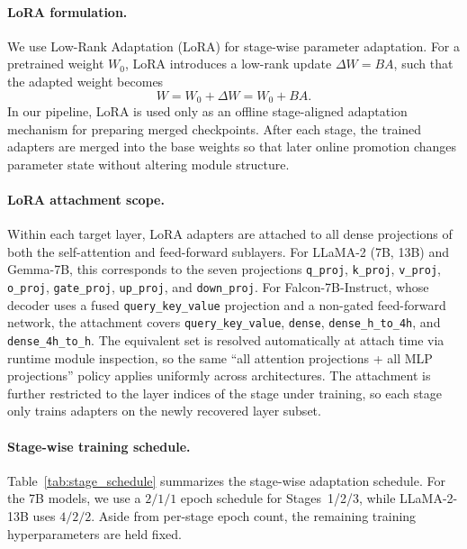 \documentclass[sigplan,anonymous,review,nonacm]{acmart}
\begin{document}
\paragraph{LoRA formulation.}
We use Low-Rank Adaptation (LoRA) for stage-wise parameter adaptation.
For a pretrained weight $W_0$, LoRA introduces a low-rank update
$\Delta W = BA$, such that the adapted weight becomes
\[
W = W_0 + \Delta W = W_0 + BA.
\]
In our pipeline, LoRA is used only as an offline stage-aligned
adaptation mechanism for preparing merged checkpoints. After each
stage, the trained adapters are merged into the base weights so that
later online promotion changes parameter state without altering module
structure.

\paragraph{LoRA attachment scope.}
Within each target layer, LoRA adapters are attached to all dense
projections of both the self-attention and feed-forward sublayers.
For LLaMA-2 (7B, 13B) and Gemma-7B, this corresponds to the seven
projections \texttt{q\_proj}, \texttt{k\_proj}, \texttt{v\_proj},
\texttt{o\_proj}, \texttt{gate\_proj}, \texttt{up\_proj}, and
\texttt{down\_proj}. For Falcon-7B-Instruct, whose decoder uses a
fused \texttt{query\_key\_value} projection and a non-gated feed-forward
network, the attachment covers \texttt{query\_key\_value}, \texttt{dense},
\texttt{dense\_h\_to\_4h}, and \texttt{dense\_4h\_to\_h}. The equivalent
set is resolved automatically at attach time via runtime module
inspection, so the same ``all attention projections + all MLP projections''
policy applies uniformly across architectures. The attachment is further
restricted to the layer indices of the stage under training, so each
stage only trains adapters on the newly recovered layer subset.

\paragraph{Stage-wise training schedule.}
Table~\ref{tab:stage_schedule} summarizes the stage-wise adaptation
schedule. For the 7B models, we use a $2/1/1$ epoch schedule for
Stages~1/2/3, while LLaMA-2-13B uses $4/2/2$. Aside from per-stage
epoch count, the remaining training hyperparameters are held fixed.

\begin{table}[t]
\centering
\caption{Stage-wise adaptation schedule.}
\label{tab:stage_schedule}
\small
\setlength{\tabcolsep}{4pt}
\end{table}
\end{document}
